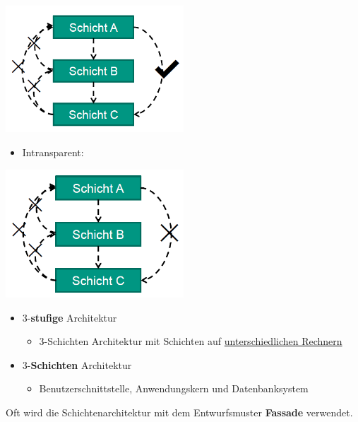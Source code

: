 \documentclass[parskip=full, 12pt]{scrartcl}
\begin{document}
				\begin{center}
					\includegraphics[width=0.5\textwidth]{../images/transparenteSchichtenarchitektur.png}
				\end{center}
			
				\newpage
				\begin{itemize}	
					\item Intransparent:	
				\end{itemize}		
		
				\begin{center}
					\includegraphics[width=0.5\textwidth]{../images/intransparenteSchichtenarchitektur.png}
				\end{center}

				\begin{itemize}	
					\item 3-\textbf{stufige} Architektur
					\begin{itemize}
						\item 3-Schichten Architektur mit Schichten auf \underline{unterschiedlichen Rechnern}
					\end{itemize}
					\item 3-\textbf{Schichten} Architektur
					\begin{itemize}
						\item Benutzerschnittstelle, Anwendungskern und Datenbanksystem
					\end{itemize}
				\end{itemize}
			
				Oft wird die Schichtenarchitektur mit dem Entwurfsmuster \textbf{Fassade} verwendet.
				
\end{document}
